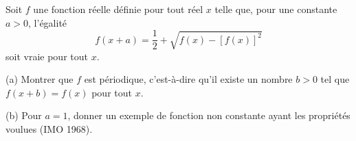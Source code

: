 Soit $f$ une fonction réelle définie pour tout réel $x$ telle que, pour une constante $a > 0$, l'égalité
\[ f(x + a) = \frac{1}{2} + \sqrt{f(x) - [f(x)]^2} \]
soit vraie pour tout $x$.

(a) Montrer que $f$ est périodique, c'est-à-dire qu'il existe un nombre $b > 0$ tel que $f(x + b) = f(x)$ pour tout $x$.

(b) Pour $a = 1$, donner un exemple de fonction non constante ayant les propriétés voulues (IMO 1968).
